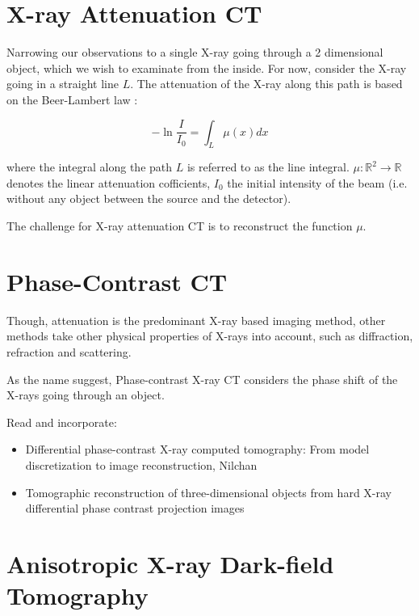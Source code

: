 
\section{X-ray Attenuation CT}


Narrowing our observations to a single X-ray going through a 2 dimensional object, which we wish to
examinate from the inside. For now, consider the X-ray going in a straight line \(L\). The
attenuation of the X-ray along this path is based on the Beer-Lambert law \cite{buzug_computed_2008}:

\begin{equation}
	\label{eq:beer-Lambert-law}
	- \ln \frac{I}{I_0} = \int_L \mu (x) dx
\end{equation}

where the integral along the path \(L\) is referred to as the line integral.
\(\mu \colon \mathbb{R}^2 \to \mathbb{R}\) denotes the linear attenuation cofficients, \(I_0\)
the initial intensity of the beam (i.e. without any object between the source and the detector).

The challenge for X-ray attenuation CT is to reconstruct the function \(\mu\).

\section{Phase-Contrast CT}

Though, attenuation is the predominant X-ray based imaging method, other methods take other physical
properties of X-rays into account, such as diffraction, refraction and scattering.

As the name suggest, Phase-contrast X-ray CT considers the phase shift of the X-rays going through
an object.

Read and incorporate:
\begin{itemize}
	\item Differential phase-contrast X-ray computed tomography: From model discretization to image
	      reconstruction, Nilchan
	\item Tomographic reconstruction of three-dimensional objects from hard X-ray differential phase
	      contrast projection images
\end{itemize}


\section{Anisotropic X-ray Dark-field Tomography}

